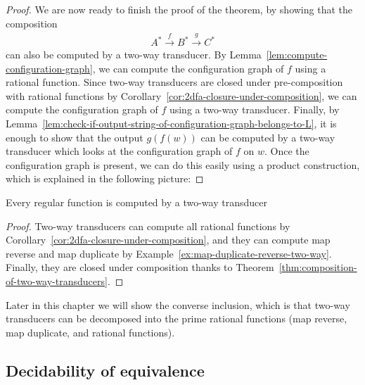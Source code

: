 \begin{proof}
    We are now ready to finish the proof of the theorem, by showing that the composition 
    \begin{align*}
     A^* \xrightarrow f B^* \xrightarrow g C^*
    \end{align*}
    can also be computed by a two-way transducer. By Lemma~\ref{lem:compute-configuration-graph}, we can compute the configuration graph of $f$ using a rational function. Since two-way transducers are closed under pre-composition with rational functions by Corollary~\ref{cor:2dfa-closure-under-composition}, we can compute the configuration graph of $f$ using a two-way transducer. Finally, by Lemma~\ref{lem:check-if-output-string-of-configuration-graph-belongs-to-L}, it is enough to show that the output $g(f(w))$ can be computed by a two-way transducer which looks at the configuration graph of $f$ on $w$. Once the configuration graph is present, we can do this easily using a product construction, which is explained in the following picture:
\end{proof}
 
 

\begin{corollary}\label{cor:2dfa-computes-all-regular-functions}
    Every regular function  is computed by a two-way transducer
\end{corollary}
\begin{proof}
    Two-way transducers can compute all rational functions by Corollary~\ref{cor:2dfa-closure-under-composition}, and they can compute  map reverse and map duplicate by Example~\ref{ex:map-duplicate-reverse-two-way}. Finally, they are closed under composition thanks to Theorem~\ref{thm:composition-of-two-way-transducers}.
\end{proof}



Later in this chapter we will show the converse inclusion, which is that two-way transducers can be decomposed into the prime rational functions (map reverse, map duplicate, and rational functions).

\subsection{Decidability of equivalence}
\label{sec:decidability-equivalence-2dfa}

